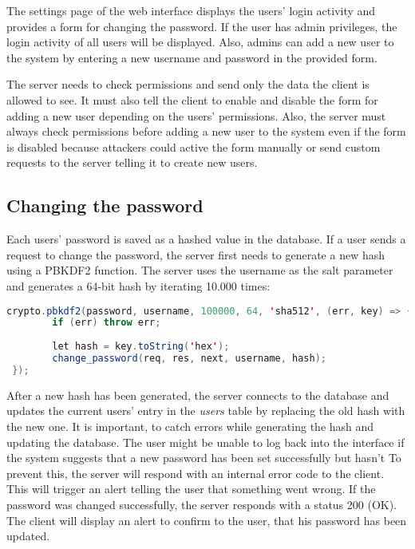 The settings page of the web interface displays the users' login activity and provides a form for changing the password. If the user has admin privileges, the login activity of all users will be displayed. Also, admins can add a new user to the system by entering a new username and password in the provided form.

The server needs to check permissions and send only the data the client is allowed to see. It must also tell the client to enable and disable the form for adding a new user depending on the users' permissions. Also, the server must always check permissions before adding a new user to the system even if the form is disabled because attackers could active the form manually or send custom requests to the server telling it to create new users.



\subsection{Changing the password}
\label{subsec:changing_the_password}

Each users' password is saved as a hashed value in the database. If a user sends a request to change the password, the server first needs to generate a new hash using a PBKDF2 function. The server uses the username as the salt parameter and generates a 64-bit hash by iterating 10.000 times:

\begin{lstlisting}[language = Java, numbers = none]
 crypto.pbkdf2(password, username, 100000, 64, 'sha512', (err, key) => {
 		if (err) throw err; 
 		
 		let hash = key.toString('hex');
 		change_password(req, res, next, username, hash);                      
 });
\end{lstlisting}

After a new hash has been generated, the server connects to the database and updates the current users' entry in the \textit{users} table by replacing the old hash with the new one. It is important, to catch errors while generating the hash and updating the database. The user might be unable to log back into the interface if the system suggests that a new password has been set successfully but hasn’t To prevent this, the server will respond with an internal error code to the client. This will trigger an alert telling the user that something went wrong. If the password was changed successfully, the server responds with a status 200 (OK). The client will display an alert to confirm to the user, that his password has been updated.



